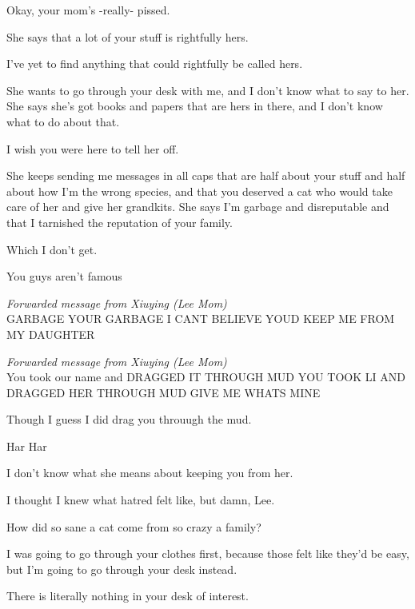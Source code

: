 { Okay, your mom's -really- pissed.

 She says that a lot of your stuff is rightfully hers.

 I've yet to find anything that could rightfully be called hers.

 She wants to go through your desk with me, and I don't know what to say to her. She says she's got books and papers that are hers in there, and I don't know what to do about that.

 I wish you were here to tell her off.

 She keeps sending me messages in all caps that are half about your stuff and half about how I'm the wrong species, and that you deserved a cat who would take care of her and give her grandkits. She says I'm garbage and disreputable and that I tarnished the reputation of your family.

 Which I don't get.

 You guys aren't famous

\emph{Forwarded message from Xiuying
(Lee Mom)}\\ GARBAGE YOUR GARBAGE I CANT BELIEVE YOUD KEEP ME FROM MY DAUGHTER

\emph{Forwarded message from Xiuying
(Lee Mom)}\\ You took our name and DRAGGED IT THROUGH MUD YOU TOOK LI AND DRAGGED HER THROUGH MUD GIVE ME WHATS MINE

 Though I guess I did drag you throuugh the mud.

 Har Har

 I don't know what she means about keeping you from her.

 I thought I knew what hatred felt like, but damn, Lee.

 How did so sane a cat come from so crazy a family?

 I was going to go through your clothes first, because those felt like they'd be easy, but I'm going to go through your desk instead.

\nopagebreak

 There is literally nothing in your desk of interest.

}
